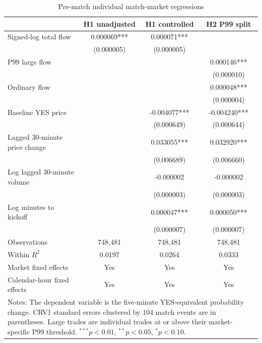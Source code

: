 \begin{table}[htbp]
\centering
\caption{Pre-match individual match-market regressions}
\label{tab:match-primary}
\small
\begin{tabular}{lccc}
\hline
 & H1 unadjusted & H1 controlled & H2 P99 split \\
\hline
Signed-log total flow & 0.000069*** & 0.000071*** &  \\
 & (0.000005) & (0.000005) &  \\
P99 large flow &  &  & 0.000146*** \\
 &  &  & (0.000010) \\
Ordinary flow &  &  & 0.000048*** \\
 &  &  & (0.000004) \\
Baseline YES price &  & -0.004077*** & -0.004240*** \\
 &  & (0.000649) & (0.000644) \\
Lagged 30-minute price change &  & 0.033055*** & 0.032920*** \\
 &  & (0.006689) & (0.006660) \\
Log lagged 30-minute volume &  & -0.000002 & -0.000002 \\
 &  & (0.000003) & (0.000003) \\
Log minutes to kickoff &  & 0.000047*** & 0.000050*** \\
 &  & (0.000007) & (0.000007) \\
\hline
Observations & 748,481 & 748,481 & 748,481 \\
Within $R^2$ & 0.0197 & 0.0264 & 0.0333 \\
Market fixed effects & Yes & Yes & Yes \\
Calendar-hour fixed effects & Yes & Yes & Yes \\
\hline
\multicolumn{4}{p{0.92\textwidth}}{\footnotesize Notes: The dependent variable is the five-minute YES-equivalent probability change. CRV1 standard errors clustered by 104 match events are in parentheses. Large trades are individual trades at or above their market-specific P99 threshold. $^{***}p<0.01$, $^{**}p<0.05$, $^{*}p<0.10$.}
\end{tabular}
\end{table}
